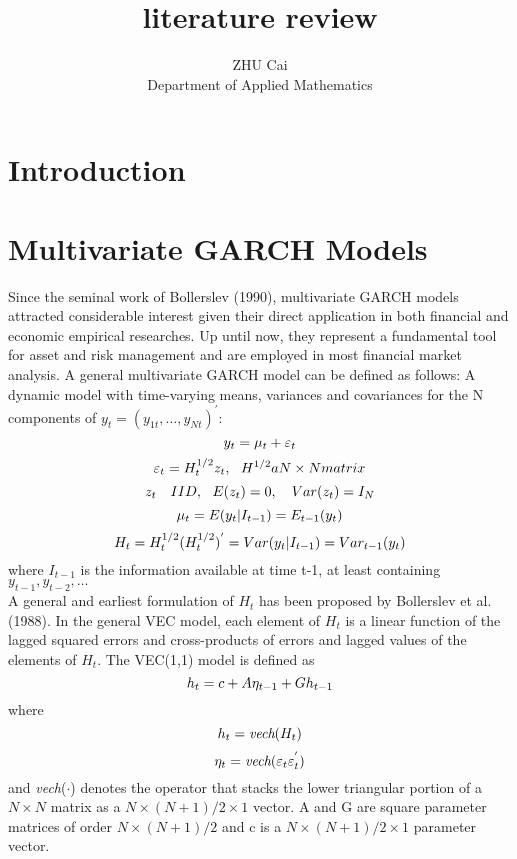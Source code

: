\documentclass[a4paper,12pt]{article}
\title{literature review}
\author{ZHU Cai\\ Department of Applied Mathematics}
\begin{document}
\maketitle
\section{Introduction}

\section{Multivariate GARCH Models}
Since the seminal work of Bollerslev (1990), multivariate GARCH models attracted considerable interest given their direct application in both financial and economic empirical researches. Up until now, they represent a fundamental tool for asset and risk management and are employed in most financial market analysis. A general multivariate GARCH model can be defined as follows:
\noindent A dynamic model with time-varying means, variances and covariances for the N components of $y_t = (y_{1t}, \ldots, y_{Nt})^{'}$:
\begin{equation}
\centering
y_t = \mu_t + \varepsilon_t
\end{equation}
\begin{equation}
\centering
\varepsilon_t = H_t^{1/2}z_t, \ \ H^{1/2} a N\times N matrix
\end{equation}
\begin{equation}
\centering
z_t \ \ \ IID, \ \ E(z_t) = 0, \ \ \ Var(z_t) = I_N
\end{equation}
\begin{equation}
\centering
\mu_t = E(y_t|I_{t-1}) = E_{t-1}(y_t)
\end{equation}
\begin{equation}
\centering
H_t = H_t^{1/2}(H_t^{1/2})^{'} = Var(y_t|I_{t-1}) = Var_{t-1}(y_t)
\end{equation}
where $I_{t-1}$ is the information available at time t-1, at least containing ${y_{t-1},y_{t-2},\dots}$\\

\noindent A general and earliest formulation of $H_t$ has been proposed by Bollerslev et al.(1988). In the general VEC model, each element of $H_t$ is a linear function of the lagged squared errors and cross-products of errors and lagged values of the elements of $H_t$. The VEC(1,1) model is defined as \\
\begin{equation}
\centering
h_t = c + A\eta_{t-1} + Gh_{t-1}
\end{equation}
\noindent where
\begin{equation}
\centering
h_t = \textit{vech}(H_t)
\end{equation}
\begin{equation}
\centering
\eta_t = \textit{vech}(\varepsilon_t\varepsilon_t^{'})
\end{equation}
and \textit{vech}($\cdot$) denotes the operator that stacks the lower triangular portion of a $N\times N$ matrix as a $N\times(N+1)/2\times1$ vector. A and G are square parameter matrices of order $N\times(N+1)/2$ and c is a $N\times(N+1)/2\times1$ parameter vector.\\
\end{document}
